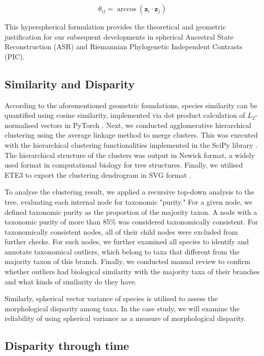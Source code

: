 $$\theta_{ij} = \arccos(\mathbf{z}_i \cdot \mathbf{z}_j)$$

This hyperspherical formulation provides the theoretical and geometric justification for our subsequent developments in spherical 
Ancestral State Reconstruction (ASR) and Riemannian Phylogenetic Independent Contrasts (PIC). 

\subsection{Similarity and Disparity}\label{subsec:mm-similarity-clustering}

According to the aforementioned geometric foundations, species similarity can be quantified using cosine similarity, implemented via
dot product calculation of $L_2$-normalised vectors in PyTorch \parencite{Ansel2024Pytorch}.
Next, we conducted agglomerative hierarchical clustering using the average
linkage method to merge clusters. This was executed with the
hierarchical clustering functionalities implemented in the SciPy
library \parencite{Gommers2025Scipy}. The hierarchical structure of the
clusters was output in Newick format, a widely used format in
computational biology for tree structures. Finally, we utilised ETE3
to export the clustering dendrogram in SVG format \parencite{Huerta2016ETE}.

To analyse the clustering result, we applied a recursive top-down
analysis to the tree, evaluating each internal node for taxonomic
"purity." For a given node, we defined taxonomic purity as
the proportion of the majority taxon. A node with a taxonomic
purity of more than 85\% was considered taxonomically consistent. For
taxonomically consistent nodes, all of their child nodes were
excluded from further checks. For such nodes, we further examined
all species to identify and annotate taxonomical outliers, which belong
to taxa that different from the majority taxon of this branch.
Finally, we conducted manual review to confirm whether outliers had
biological similarity with the majority taxa of their branches and
what kinds of similarity do they have. 

Similarly, spherical vector variance of species is utilised to assess the morphological
disparity among taxa. In the case study, we will examine the reliability of using spherical variance as a measure of morphological disparity.

\subsection{Disparity through time}\label{subsec:mm-disparity-through-time}

